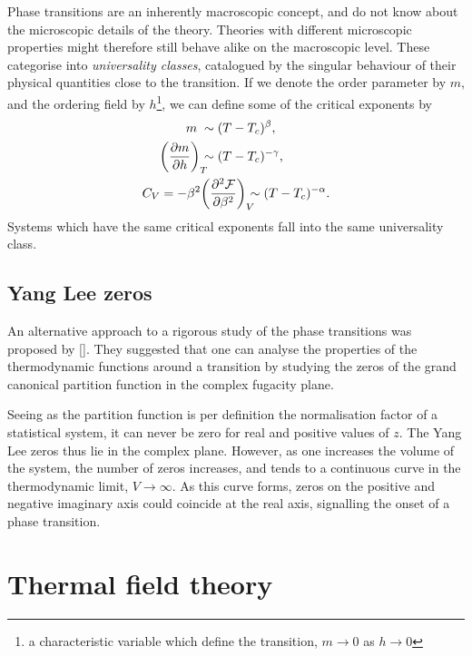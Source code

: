 Phase transitions are an inherently macroscopic concept, and do not know about
the microscopic details of the theory. Theories with different microscopic
properties might therefore still behave alike on the macroscopic level. These
categorise into \emph{universality classes}, catalogued by the singular
behaviour of their physical quantities close to the transition. If we denote the
order parameter by $m$, and the ordering field by $h$\footnote{a characteristic
variable which define the transition, $m\to0$ as $h\to0$}, we can define some of
the critical exponents by
%
\begin{align}
  m \;&\sim (T - T_c)^{\beta}, \\
  \bigg(\frac{\partial m}{\partial h}\bigg)_{\mathrlap{T}} &\sim (T - T_c)^{-\gamma}, \\
  C_V = - \beta^2 &\bigg(\frac{\partial^2 \mathcal{F}}{\partial
    \beta^2}\bigg)_{\mathrlap{V}} \sim (T - T_c)^{-\alpha}.
\end{align}
%
Systems which have the same critical exponents fall into the same universality
class. 

\subsection{Yang Lee zeros} \label{sec:yang_lee_zeros_intro}

An alternative approach to a rigorous study of the phase transitions was
proposed by \citeauthor{Yang:1952be} [\citeyear{Yang:1952be,Lee:1952ig}]. They suggested that one
can analyse the properties of the thermodynamic functions around a transition by
studying the zeros of the grand canonical partition function in the complex
fugacity plane.

Seeing as the partition function is per definition the normalisation factor of a
statistical system, it can never be zero for real and positive values of $z$.
The Yang Lee zeros thus lie in the complex plane.  However, as one increases the
volume of the system, the number of zeros increases, and tends to a continuous
curve in the thermodynamic limit, $V\to\infty$. As this curve forms, zeros on
the positive and negative imaginary axis could coincide at the real axis,
signalling the onset of a phase transition.

\section{Thermal field theory} \label{sec:thermal-field-theory}

